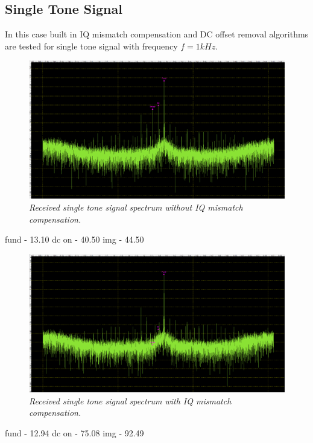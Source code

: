 \documentclass[en,printmode]{mgr}
\begin{document}
		\subsection*{Single Tone Signal}
		In this case built in IQ mismatch compensation and DC offset removal algorithms are
	 	tested for
		single tone signal with frequency $f=1kHz$.
		\begin{figure}[H]
    			\centering
   				\includegraphics[width=\textwidth]{plots/real_single_off.png}
   		 		\caption{\textit{Received single tone signal spectrum without IQ mismatch compensation.}}
   		 	\end{figure}
   		 	fund - 13.10
   		 	dc on - 40.50
   		 	img - 44.50
   		 	\begin{figure}[H]
    			\centering
   				\includegraphics[width=\textwidth]{plots/real_single_on.png}
   		 		\caption{\textit{Received single tone signal spectrum with IQ mismatch compensation.}}
   		 	\end{figure}
   		 	fund - 12.94
   		 	dc on - 75.08
   		 	img - 92.49
   		\newpage
\end{document}
